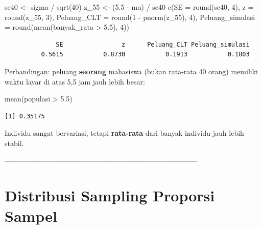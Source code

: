 \documentclass[
  indonesian,
  letterpaper,
]{book}
\newenvironment{Shaded}{\begin{snugshade}}{\end{snugshade}}
\newcommand{\AttributeTok}[1]{\textcolor[rgb]{0.40,0.45,0.13}{#1}}
\newcommand{\DecValTok}[1]{\textcolor[rgb]{0.68,0.00,0.00}{#1}}
\newcommand{\FloatTok}[1]{\textcolor[rgb]{0.68,0.00,0.00}{#1}}
\newcommand{\FunctionTok}[1]{\textcolor[rgb]{0.28,0.35,0.67}{#1}}
\newcommand{\NormalTok}[1]{\textcolor[rgb]{0.00,0.23,0.31}{#1}}
\newcommand{\OtherTok}[1]{\textcolor[rgb]{0.00,0.23,0.31}{#1}}
\newcommand{\SpecialCharTok}[1]{\textcolor[rgb]{0.37,0.37,0.37}{#1}}
\begin{document}
\begin{Shaded}
\begin{Highlighting}[]
\NormalTok{se40 }\OtherTok{\textless{}{-}}\NormalTok{ sigma }\SpecialCharTok{/} \FunctionTok{sqrt}\NormalTok{(}\DecValTok{40}\NormalTok{)}
\NormalTok{z\_55 }\OtherTok{\textless{}{-}}\NormalTok{ (}\FloatTok{5.5} \SpecialCharTok{{-}}\NormalTok{ mu) }\SpecialCharTok{/}\NormalTok{ se40}
\FunctionTok{c}\NormalTok{(}\AttributeTok{SE =} \FunctionTok{round}\NormalTok{(se40, }\DecValTok{4}\NormalTok{), }\AttributeTok{z =} \FunctionTok{round}\NormalTok{(z\_55, }\DecValTok{3}\NormalTok{),}
\AttributeTok{Peluang\_CLT =} \FunctionTok{round}\NormalTok{(}\DecValTok{1} \SpecialCharTok{{-}} \FunctionTok{pnorm}\NormalTok{(z\_55), }\DecValTok{4}\NormalTok{),}
\AttributeTok{Peluang\_simulasi =} \FunctionTok{round}\NormalTok{(}\FunctionTok{mean}\NormalTok{(banyak\_rata }\SpecialCharTok{\textgreater{}} \FloatTok{5.5}\NormalTok{), }\DecValTok{4}\NormalTok{))}
\end{Highlighting}
\end{Shaded}

\begin{verbatim}
              SE                z      Peluang_CLT Peluang_simulasi 
          0.5615           0.8730           0.1913           0.1803 
\end{verbatim}

Perbandingan: peluang \textbf{seorang} mahasiswa (bukan rata-rata 40
orang) memiliki waktu layar di atas 5,5 jam jauh lebih besar:

\begin{Shaded}
\begin{Highlighting}[]
\FunctionTok{mean}\NormalTok{(populasi }\SpecialCharTok{\textgreater{}} \FloatTok{5.5}\NormalTok{)}
\end{Highlighting}
\end{Shaded}

\begin{verbatim}
[1] 0.35175
\end{verbatim}

Individu sangat bervariasi, tetapi \textbf{rata-rata} dari banyak
individu jauh lebih stabil.

──────────────────────────────────────

\section{Distribusi Sampling Proporsi
Sampel}\label{distribusi-sampling-proporsi-sampel}
\end{document}
